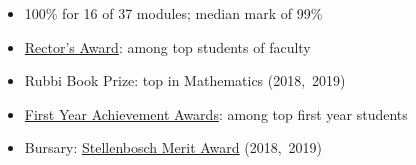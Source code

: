\begin{itemize}
    \ifindustry %
        \teamcontests
        \topcsfirstyear
    \fi %
    \item 100\% for 16 of 37 modules; median mark of 99\%
    \item \href{https://www.sun.ac.za/english/Lists/news/DispForm.aspx?ID=7717}{Rector's Award}:
		among top students of faculty
    \item Rubbi Book Prize: top in Mathematics (2018,~2019)
    \ifindustry\else %
        \topcsfirstyear
    \fi %
    \item \href{https://www.sun.ac.za/english/learning-teaching/ctl/t-l-awards-and-grants/first-years-prestige-dinner}%
		{First Year Achievement Awards}: among top first year students
    \ifindustry\else %
        \teamcontests
    \fi %
    \item Bursary: \href{https://finaid.sun.ac.za/merit-bursary}%
		{Stellenbosch Merit Award} (2018,~2019)
\end{itemize}

